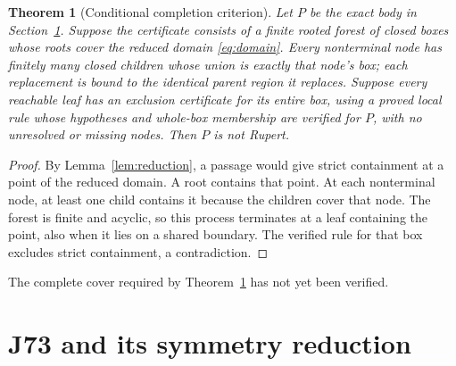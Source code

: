 \documentclass[11pt]{amsart}
\newtheorem{theorem}{Theorem}[section]
\theoremstyle{definition}
\theoremstyle{remark}
\begin{document}
\begin{theorem}[Conditional completion criterion]\label{thm:completion}
Let $P$ be the exact body in Section~\ref{sec:body}. Suppose the
certificate consists of a finite rooted forest of closed boxes whose
roots cover the reduced domain \eqref{eq:domain}. Every nonterminal node
has finitely many closed children whose union is exactly that node's box;
each replacement is bound to the identical parent region it replaces.
Suppose every reachable leaf has an exclusion certificate for its entire
box, using a proved local rule whose hypotheses and whole-box membership
are verified for $P$, with no unresolved or missing nodes. Then $P$ is
not Rupert.
\end{theorem}
\begin{proof}
By Lemma~\ref{lem:reduction}, a passage would give strict containment at
a point of the reduced domain. A root contains that point. At each
nonterminal node, at least one child contains it because the children
cover that node. The forest is finite and acyclic, so this process
terminates at a leaf containing the point,
also when it lies on a shared boundary. The verified rule for that box
excludes strict containment, a contradiction.
\end{proof}

The complete cover required by Theorem~\ref{thm:completion} has not yet
been verified.

\section{J73 and its symmetry reduction}\label{sec:body}
\end{document}
